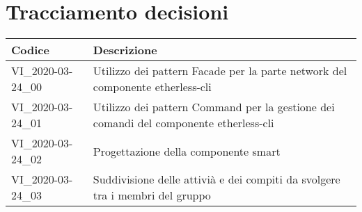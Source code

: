 \section{Tracciamento decisioni}
\renewcommand{\arraystretch}{1.8}

\begin{longtable}{|p{5cm}|p{8cm}|}
	\hline
	
	\rowcolor{header}
	\textbf{Codice} & \textbf{Descrizione} \\
	
	\hline
	
	VI\_2020-03-24\_00 & Utilizzo dei pattern Facade per la parte network del componente etherless-cli\\ 
	VI\_2020-03-24\_01 & Utilizzo dei pattern Command per la gestione dei comandi del componente etherless-cli\\ 
	VI\_2020-03-24\_02 & Progettazione della componente smart\\
	VI\_2020-03-24\_03 & Suddivisione delle attivià e dei compiti da svolgere tra i membri del gruppo \\
	\hline
\end{longtable}